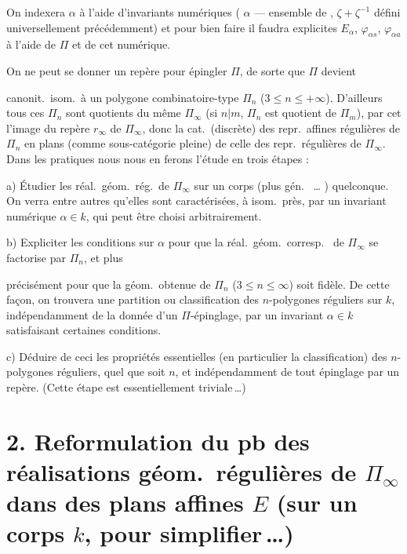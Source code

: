 \documentclass[11pt,a4paper]{article}
\begin{document}
On indexera $\alpha$ à l'aide d'invariants numériques ( $\alpha$ — ensemble  de ,  $\zeta + \zeta^{-1}$ défini universellement précédemment) et pour bien faire il faudra   explicites $E_\alpha$, $\varphi_{\alpha s}$, $\varphi_{\alpha a}$ à l'aide de $\Pi$ et de cet  numérique.

On ne peut  se donner un repère  pour épingler $\Pi$, de sorte que $\Pi$ devient

canonit.\ isom.\ à un polygone combinatoire-type $\Pi_n$ ($3 \leq n \leq +\infty$). D'ailleurs tous ces $\Pi_n$ sont  quotients du même $\Pi_\infty$ (si $n | m$, $\Pi_n$ est quotient de $\Pi_m$), par cet  l'image du repère $r_\infty$ de $\Pi_\infty$, donc la cat.\ (discrète) des repr.\ affines régulières de $\Pi_n$ en plans (comme sous-catégorie pleine) de celle des repr.\ régulières de $\Pi_\infty$. Dans les  pratiques nous nous en ferons l'étude en trois étapes :

a) Étudier les réal.\ géom.\ rég.\ de $\Pi_\infty$ sur un corps (plus gén.\  \ldots{} \uncertain{(\ill{})}) \struck{\ill{}} quelconque. On verra entre autres qu'elles sont caractérisées, à isom.\ près, par un invariant numérique $\alpha \in k$, qui peut être choisi arbitrairement.

b) Expliciter les conditions sur $\alpha$ pour que la réal.\ géom.\ corresp.\  de $\Pi_\infty$ se factorise par $\Pi_n$, et plus

précisément pour que la   géom.\ obtenue de $\Pi_n$ ($3 \leq n \leq \infty$) soit fidèle. De cette façon, on trouvera une partition ou classification des  $n$-polygones réguliers sur $k$, indépendamment de la donnée d'un $\Pi$-épinglage, par \struck{\ill{}} un invariant $\alpha \in k$ satisfaisant certaines conditions.

c) Déduire de ceci les \struck{\ill{}} propriétés essentielles  (en particulier la classification) des $n$-polygones réguliers, quel que soit $n$, et indépendamment de tout épinglage par un repère. (Cette étape est essentiellement triviale\,…)

\section{2. Reformulation du pb des réalisations géom.\ régulières de $\Pi_\infty$ dans des plans affines $E$ (sur un corps $k$, pour simplifier\,…)}
\end{document}
